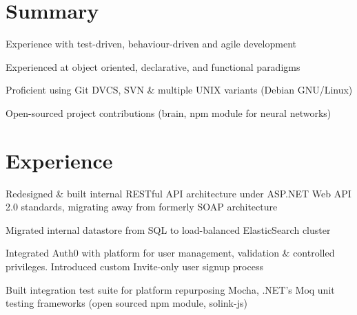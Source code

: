 \begin{minipage}[t]{0.66\textwidth} %

        \section{Summary}
        \vspace{\topsep} %
        \begin{tightitemize}
                \item Experience with test-driven, behaviour-driven and agile development
                \item Experienced at object oriented, declarative, and functional paradigms
                \item Proficient using Git DVCS, SVN \& multiple UNIX variants (Debian GNU/Linux)
                \item Open-sourced project contributions (brain, npm module for neural networks)
        \end{tightitemize}


        \section{Experience}


        \begin{tightitemize}
                \item Redesigned \& built internal RESTful API architecture under ASP.NET Web API 2.0 standards, migrating away from formerly SOAP architecture
                \item Migrated internal datastore from SQL to load-balanced ElasticSearch cluster
                \item Integrated Auth0 with platform for user management, validation \& controlled privileges. Introduced custom Invite-only user signup process
                \item Built integration test suite for platform repurposing Mocha, .NET's Moq unit testing frameworks (open sourced npm module, solink-js) 


\end{tightitemize}
\end{minipage}
